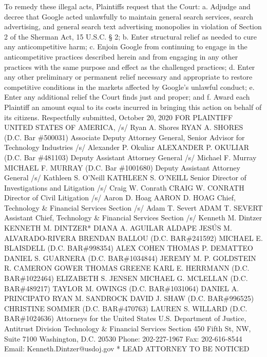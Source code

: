 \documentclass[11pt,b5paper]{scrartcl}
\begin{document}
To remedy these illegal acts, Plaintiffs request that the Court:
a.
Adjudge and decree that Google acted unlawfully to maintain general
search services, search advertising, and general search text advertising
monopolies in violation of Section 2 of the Sherman Act, 15 U.S.C. § 2;
b.
Enter structural relief as needed to cure any anticompetitive harm;
c.
Enjoin Google from continuing to engage in the anticompetitive practices
described herein and from engaging in any other practices with the same
purpose and effect as the challenged practices;
d.
Enter any other preliminary or permanent relief necessary and appropriate
to restore competitive conditions in the markets affected by Google’s
unlawful conduct;
e.
Enter any additional relief the Court finds just and proper; and
f.
Award each Plaintiff an amount equal to its costs incurred in bringing this
action on behalf of its citizens.
Respectfully submitted,
October 20, 2020
FOR PLAINTIFF UNITED STATES OF AMERICA,
/s/ Ryan A. Shores
RYAN A. SHORES (D.C. Bar \#500031)
Associate Deputy Attorney General,
Senior Advisor for Technology Industries
/s/ Alexander P. Okuliar
ALEXANDER P. OKULIAR (D.C. Bar \#481103)
Deputy Assistant Attorney General
/s/ Michael F. Murray
MICHAEL F. MURRAY (D.C. Bar \#1001680)
Deputy Assistant Attorney General
/s/ Kathleen S. O’Neill
KATHLEEN S. O’NEILL
Senior Director of Investigations and Litigation
/s/ Craig W. Conrath
CRAIG W. CONRATH
Director of Civil Litigation
/s/ Aaron D. Hoag
AARON D. HOAG
Chief, Technology \& Financial Services Section
/s/ Adam T. Severt
ADAM T. SEVERT
Assistant Chief, Technology \& Financial Services
Section
/s/ Kenneth M. Dintzer
KENNETH M. DINTZER*
DIANA A. AGUILAR ALDAPE
JESÚS M. ALVARADO-RIVERA
BRENDAN BALLOU (D.C. BAR\#241592)
MICHAEL E. BLAISDELL (D.C. BAR\#998354)
ALEX COHEN
THOMAS P. DEMATTEO
DANIEL S. GUARNERA (D.C. BAR\#1034844)
JEREMY M. P. GOLDSTEIN
R. CAMERON GOWER
THOMAS GREENE
KARL E. HERRMANN (D.C. BAR\#1022464)
ELIZABETH S. JENSEN
MICHAEL G. MCLELLAN (D.C. BAR\#489217)
TAYLOR M. OWINGS (D.C. BAR\#1031064)
DANIEL A. PRINCIPATO
RYAN M. SANDROCK
DAVID J. SHAW (D.C. BAR\#996525)
CHRISTINE SOMMER (D.C. BAR\#470763)
LAUREN S. WILLARD (D.C. BAR\#1024636)
Attorneys for the United States
U.S. Department of Justice, Antitrust Division
Technology \& Financial Services Section
450 Fifth St, NW, Suite 7100
Washington, D.C. 20530
Phone: 202-227-1967
Fax: 202-616-8544
Email: Kenneth.Dintzer@usdoj.gov
* LEAD ATTORNEY TO BE NOTICED
\end{document}
